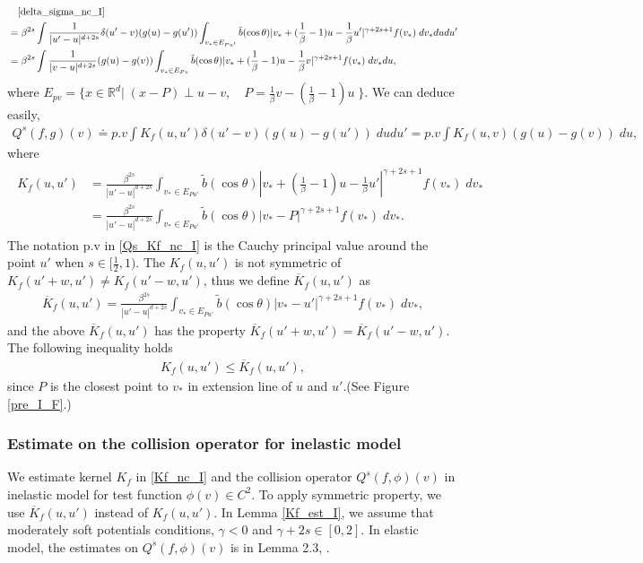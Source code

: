 \documentclass[reqno,10pt]{amsart}
\numberwithin{equation}{section}
\begin{document}
\begin{align}
&\quad \eqref{delta_sigma_nc_I} \notag \\
    &=\beta^{2s}\int  \frac{1}{|u'-u|^{d+2s}}\delta(u'-v)(g(u)-g(u'))\int_{v_*\in E_{Pu'}} \tilde{b} (\cos\theta) |v_*+(\frac{1}{\beta}-1)u-\frac{1}{\beta}u'|^{\gamma+2s+1}f(v_*)\; dv_*dudu' \notag \\
    &=\beta^{2s}\int \frac{1}{|v-u|^{d+2s}}(g(u)-g(v))\int_{v_*\in E_{Pv}} \tilde{b} (\cos\theta) |v_*+(\frac{1}{\beta}-1)u-\frac{1}{\beta}v|^{\gamma+2s+1}f(v_*)\; dv_*du,  \notag
\end{align}
where $E_{pv}=\{x \in \mathbb{R}^d|\; (x-P)\;\bot \;u-v , \quad P=\frac{1}{\beta}v-(\frac{1}{\beta}-1)u\;\}$. 
We can deduce easily, 
\begin{align} \label{Qs_Kf_nc_I}
Q^{s}(f,g)(v) 
\doteq p.v\int K_f(u,u')\delta(u'-v)(g(u)-g(u')) \;dudu'
= p.v\int K_f(u,v)(g(u)-g(v)) \;du,
\end{align}
where 
\begin{align} \label{Kf_nc_I}
\begin{split}
    K_f(u,u') &= \frac{\beta^{2s}}{|u'-u|^{d+2s}}\int_{v_*\in E_{Pu'}} \tilde{b} (\cos\theta) |v_*+(\frac{1}{\beta}-1)u-\frac{1}{\beta}u'|^{\gamma+2s+1}f(v_*)\; dv_*\\
&=\frac{\beta^{2s}}{|u'-u|^{d+2s}}\int_{v_*\in E_{Pu'}} \tilde{b} (\cos\theta) |v_*-P|^{\gamma+2s+1}f(v_*)\; dv_*. 
\end{split}
\end{align}
The notation p.v in \eqref{Qs_Kf_nc_I} is the Cauchy principal value around the point $u'$ when $s\in[\frac{1}{2},1).$ 
The $K_f(u,u')$ is not symmetric of $K_f(u'+w,u')\neq K_f(u'-w,u')$, thus we define $\overline{K}_{f}(u,u')$ as
\begin{align} \label{K'_f_nc_I}
    \overline{K}_{f}(u,u') = \frac{\beta^{2s}}{|u'-u|^{d+2s}}\int_{v_*\in E_{Pu'}} \tilde{b} (\cos\theta) {|v_*-u'|}^{\gamma+2s+1}f(v_*)\; dv_*,
\end{align} and the above $\overline{K}_{f}(u,u')$ has the property
$\overline{K}_f(u'+w,u')= \overline{K}_f(u'-w,u')$.
The following inequality holds
\begin{align} \label{K_I_inequal}
    K_f(u,u') \leq \overline{K}_{f}(u,u'),
\end{align}
since $P$ is the closest point to $v_*$ in extension line of $u$ and $u'$.(See Figure \ref{pre_I_F}.) \vspace{3mm}

\subsubsection{Estimate on the collision operator for inelastic model}
We estimate kernel $K_f$ in \eqref{Kf_nc_I} and the collision operator $Q^{s}(f,\phi)(v)$ in inelastic model for test function $\phi(v)\in C^{2}.$ To apply symmetric property, we use $\overline{K}_f(u,u')$ instead of $K_f(u,u')$. In Lemma \ref{Kf_est_I}, we assume that  moderately soft potentials conditions, $\gamma<0$ and $\gamma+2s \in [0,2]$. In elastic model, the estimates on $Q^{s}(f,\phi)(v)$ is in Lemma 2.3, \cite{IM2020}. \\
 
\end{document}
